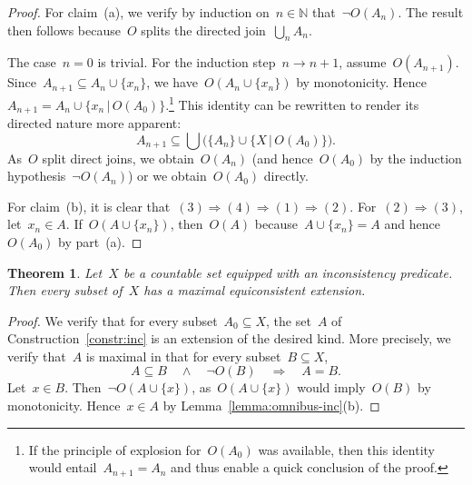 \documentclass[com,11pt,crcready]{iosart2x}
\theoremstyle{definition}
\theoremstyle{plain}
\newtheorem{theorem}[definition]{Theorem}
\theoremstyle{remark}
\newcommand{\?}{\,{:}\,}
\newcommand{\NN}{\mathbb{N}}
\renewcommand{\_}{\mathpunct{.}\,}
\begin{document}
\begin{proof}For claim~(a), we verify by induction on~$n \in \NN$ that~$\neg
O(A_n)$. The result then follows because~$O$ splits the directed join~$\bigcup_n A_n$.

The case~$n = 0$ is trivial. For the induction step~$n \to n+1$,
assume~$O(A_{n+1})$. Since~$A_{n+1} \subseteq A_n \cup \{x_n\}$, we have~$O(A_n
\cup \{ x_n \})$ by monotonicity. Hence~$A_{n+1} = A_n \cup \{ x_n \,|\, O(A_0)
\}$.\footnote{If the principle of explosion for~$O(A_0)$ was available, then
this identity would entail~$A_{n+1} = A_n$ and thus enable a quick conclusion
of the proof.} This identity can be rewritten to render its directed nature
more apparent:
\[ A_{n+1} \subseteq \bigcup \bigl(\{A_n\} \cup \{X \,|\, O(A_0)\}\bigr). \]
As~$O$ split direct joins, we obtain~$O(A_n)$ (and hence~$O(A_0)$ by the
induction hypothesis~$\neg O(A_n)$) or we obtain~$O(A_0)$ directly.

For claim~(b), it is clear that~$(3) \Rightarrow (4) \Rightarrow (1) \Rightarrow
(2)$. For~$(2) \Rightarrow (3)$, let~$x_n \in A$.
If~$O(A\cup\{x_n\})$, then~$O(A)$ because~$A\cup\{x_n\}=A$ and hence~$O(A_0)$
by part~(a).
\end{proof}

\begin{theorem}\label{thm:max-inc-countable}Let~$X$ be a countable set equipped
with an inconsistency predicate. Then every subset of~$X$ has a maximal
equiconsistent extension.\end{theorem}

\begin{proof}We verify that for every subset~$A_0 \subseteq X$, the set~$A$ of
Construction~\ref{constr:inc} is an extension of the desired kind. More
precisely, we verify that~$A$ is maximal in that for every subset~$B \subseteq X$,
\[ A \subseteq B \quad\wedge\quad \neg O(B) \quad\Longrightarrow\quad A = B. \]
Let~$x \in B$. Then~$\neg O(A \cup \{ x \})$, as~$O(A \cup \{x\})$
would imply~$O(B)$ by monotonicity. Hence~$x \in A$ by
Lemma~\ref{lemma:omnibus-inc}(b).
\end{proof}
\end{document}
